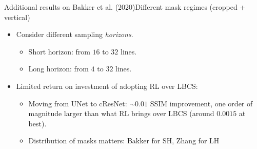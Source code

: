 \begin{frame}{Additional results on Bakker et al. (2020)}{Different mask regimes (cropped + vertical)}
    \begin{itemize}
        \item Consider different sampling \textit{horizons}.
        \begin{itemize}
            \item Short horizon: from $16$ to $32$ lines.
            \item Long horizon: from $4$ to $32$ lines.
        \end{itemize}
        \item Limited return on investment of adopting RL over LBCS:
        \begin{itemize}
            \item Moving from UNet to cResNet:  $\sim 0.01$ SSIM improvement, one order of magnitude larger than what RL brings over LBCS (around $0.0015$ at best).
            \item Distribution of masks matters: Bakker for SH, Zhang for LH
        \end{itemize}
    \end{itemize}


\end{frame}
